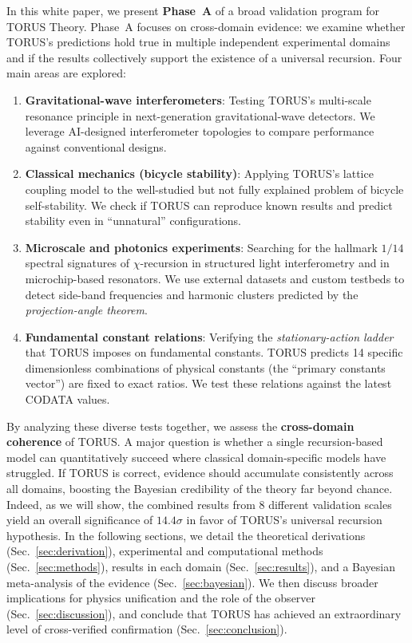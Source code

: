 \documentclass[12pt]{article}
\begin{document}
In this white paper, we present \textbf{Phase~A} of a broad validation program for TORUS Theory. Phase~A focuses on cross-domain evidence: we examine whether TORUS’s predictions hold true in multiple independent experimental domains and if the results collectively support the existence of a universal recursion. Four main areas are explored:
\begin{enumerate}\itemsep 0pt
    \item \textbf{Gravitational-wave interferometers}: Testing TORUS’s multi-scale resonance principle in next-generation gravitational-wave detectors. We leverage AI-designed interferometer topologies to compare performance against conventional designs.
    \item \textbf{Classical mechanics (bicycle stability)}: Applying TORUS’s lattice coupling model to the well-studied but not fully explained problem of bicycle self-stability. We check if TORUS can reproduce known results and predict stability even in “unnatural” configurations.
    \item \textbf{Microscale and photonics experiments}: Searching for the hallmark $1/14$ spectral signatures of $\chi$-recursion in structured light interferometry and in microchip-based resonators. We use external datasets and custom testbeds to detect side-band frequencies and harmonic clusters predicted by the \emph{projection-angle theorem}.
    \item \textbf{Fundamental constant relations}: Verifying the \emph{stationary-action ladder} that TORUS imposes on fundamental constants. TORUS predicts 14 specific dimensionless combinations of physical constants (the “primary constants vector”) are fixed to exact ratios. We test these relations against the latest CODATA values.
\end{enumerate}

By analyzing these diverse tests together, we assess the \textbf{cross-domain coherence} of TORUS. A major question is whether a single recursion-based model can quantitatively succeed where classical domain-specific models have struggled. If TORUS is correct, evidence should accumulate consistently across all domains, boosting the Bayesian credibility of the theory far beyond chance. Indeed, as we will show, the combined results from 8 different validation scales yield an overall significance of $14.4\sigma$ in favor of TORUS’s universal recursion hypothesis. In the following sections, we detail the theoretical derivations (Sec.~\ref{sec:derivation}), experimental and computational methods (Sec.~\ref{sec:methods}), results in each domain (Sec.~\ref{sec:results}), and a Bayesian meta-analysis of the evidence (Sec.~\ref{sec:bayesian}). We then discuss broader implications for physics unification and the role of the observer (Sec.~\ref{sec:discussion}), and conclude that TORUS has achieved an extraordinary level of cross-verified confirmation (Sec.~\ref{sec:conclusion}). 
\end{document}
